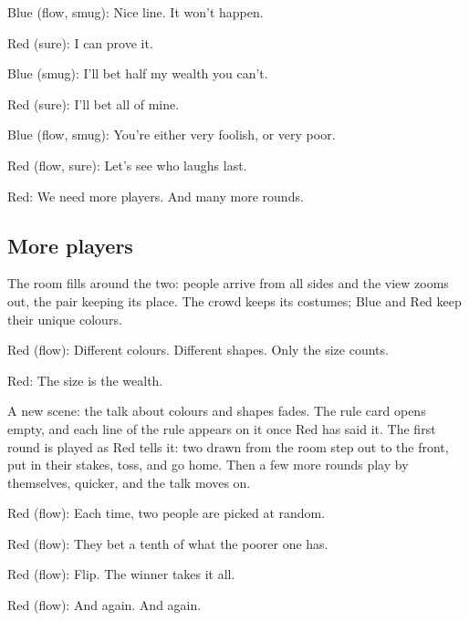 Blue (flow, smug): Nice line. It won't happen.

Red (sure): I can prove it.

Blue (smug): I'll bet half my wealth you can't.

Red (sure): I'll bet all of mine.

Blue (flow, smug): You're either very foolish,
or very poor.

Red (flow, sure): Let's see who laughs last.

Red: We need more players.
And many more rounds.

\subsection{More players}\label{act:more}

\label{room}

The room fills around the two: people arrive from all sides and the view
zooms out, the pair keeping its place. The crowd keeps its costumes; Blue
and Red keep their unique colours.

Red (flow): Different colours.
Different shapes.
Only the size counts.

Red: The size is the wealth.

\label{rule}

A new scene: the talk about colours and shapes fades. The rule card opens
empty, and each line of the rule appears on it once Red has said it. The
first round is played as Red tells it: two drawn from the room step out to
the front, put in their stakes, toss, and go home. Then a few more rounds
play by themselves, quicker, and the talk moves on.

Red (flow): Each time,
two people are picked at random.

Red (flow): They bet a tenth of what the poorer one has.

Red (flow): Flip.
The winner takes it all.

Red (flow): And again. And again.

